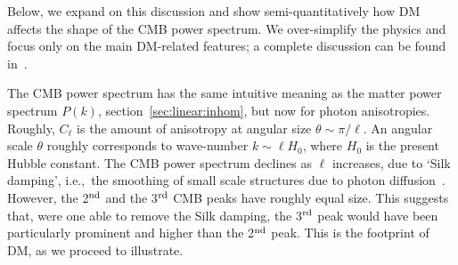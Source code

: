 Below, we expand on this discussion and show semi-quantitatively how DM affects the shape of the CMB power spectrum.  
We over-simplify the physics and focus only on the main DM-related features; a complete discussion can be found in~\cite{CMB:reviews}.

\medskip

The CMB power spectrum has the same intuitive meaning as the matter power spectrum $P(k)$, section~\ref{sec:linear:inhom}, but now for photon anisotropies. Roughly, $C_\ell$ is the amount of anisotropy at angular size $\theta \sim \pi/\ell$.
An angular scale $\theta$ roughly corresponds to wave-number $k \sim \ell H_0$, where $H_0$ is the present Hubble constant.
The CMB power spectrum declines as $\ell$ increases, due to `Silk damping', i.e.,~the smoothing of small scale structures due to photon diffusion~\cite{SilkDamping}. However, the 2$^{\rm nd}$ and the 3$^{\rm rd}$ CMB peaks have roughly equal size. This suggests that, were one able to remove the Silk damping, the 3$^{\rm rd}$ peak would have been particularly prominent and higher than the 2$^{\rm nd}$ peak. This is the footprint of DM, as we proceed to illustrate. 

\medskip

